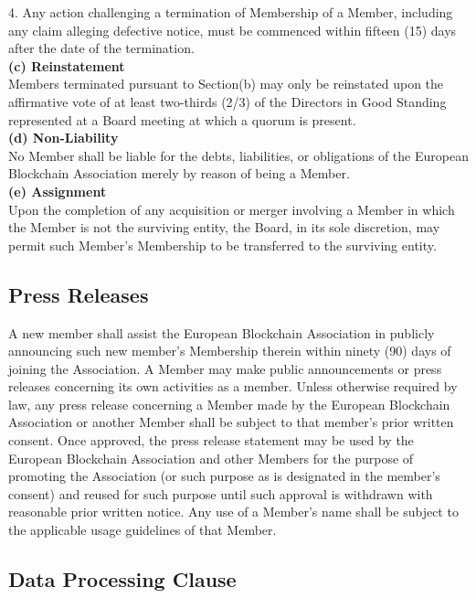 \documentclass{article}
\begin{document}
4. Any action challenging a termination of Membership of a Member, including any claim alleging defective notice, must be commenced within fifteen (15) days after the date of the termination. \\

\textbf{(c) Reinstatement} \\

Members terminated pursuant to Section(b) may only be reinstated upon the affirmative vote of at least two-thirds (2/3) of the Directors in Good Standing represented at a Board meeting at which a quorum is present. \\

\textbf{(d) Non-Liability} \\

No Member shall be liable for the debts, liabilities, or obligations of the European Blockchain Association merely by reason of being a Member. \\

\textbf{(e) Assignment} \\

Upon the completion of any acquisition or merger involving a Member in which the Member is not the surviving entity, the Board, in its sole discretion, may permit such Member's Membership to be transferred to the surviving entity.

\subsection{Press Releases}

A new member shall assist the European Blockchain Association in publicly announcing such new member's Membership therein within ninety (90) days of joining the Association. 
A Member may make public announcements or press releases concerning its own activities as a member. 
Unless otherwise required by law, any press release concerning a Member made by the European Blockchain Association or another Member shall be subject to that member's prior written consent. 
Once approved, the press release statement may be used by the European Blockchain Association and other Members for the purpose of promoting the Association (or such purpose as is designated in the member's consent) and reused for such purpose until such approval is withdrawn with reasonable prior written notice. 
Any use of a Member's name shall be subject to the applicable usage guidelines of that Member.

\subsection{Data Processing Clause}
\end{document}
